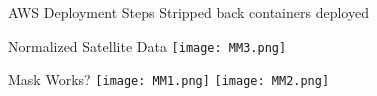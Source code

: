 \begin{frame}{AWS Deployment Steps}
    Stripped back containers deployed
\end{frame}

\begin{frame}{Normalized Satellite Data}
     \centering
     \texttt{[image: MM3.png]}
\end{frame}

\begin{frame}{Mask Works?}
     \centering
     \texttt{[image: MM1.png]}
     \texttt{[image: MM2.png]}
\end{frame}
